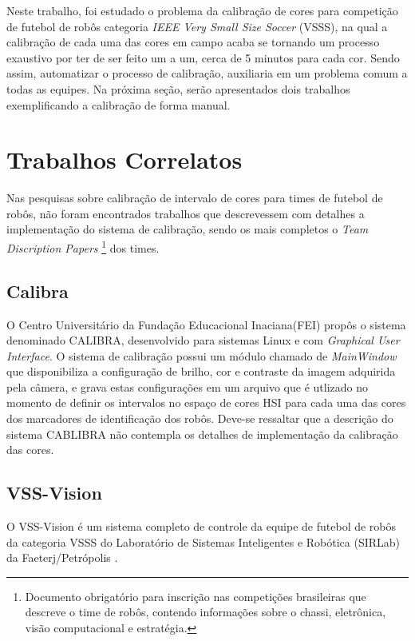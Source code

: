 Neste trabalho, foi estudado o problema da calibração de cores para competição de futebol de robôs categoria {\it IEEE Very Small Size Soccer} (VSSS), na qual a calibração de cada uma das cores em campo acaba se tornando um processo exaustivo por ter de ser feito um a um, cerca de 5 minutos para cada cor. Sendo assim, automatizar o processo de calibração, auxiliaria em um problema comum a todas as equipes. Na próxima seção, serão apresentados dois trabalhos exemplificando a calibração de forma manual.  

\section{Trabalhos Correlatos}
Nas pesquisas sobre calibração de intervalo de cores para times de futebol de robôs, não foram encontrados trabalhos que descrevessem com detalhes a implementação do sistema de calibração, sendo os mais completos o {\it Team Discription Papers}
\footnote{Documento obrigatório para inscrição nas competições brasileiras que descreve o time de robôs, contendo informações sobre o chassi, eletrônica, visão computacional e estratégia.} 
dos times.

\subsection{Calibra}
O Centro Universitário da Fundação Educacional Inaciana(FEI) propôs o sistema denominado CALIBRA, desenvolvido para sistemas Linux e com {\it Graphical User Interface}. O sistema de calibração possui um módulo chamado de {\it MainWindow} que disponibiliza a configuração de brilho, cor e contraste da imagem adquirida pela câmera, e grava estas configurações em um arquivo que é utlizado no momento de definir os intervalos no espaço de cores HSI para cada uma das cores dos marcadores de identificação dos robôs\cite{Penharbel:2004,PenharbelTime}. Deve-se ressaltar que a descrição do sistema CABLIBRA não contempla os detalhes de implementação da calibração das cores.

\subsection{VSS-Vision}

O VSS-Vision é um sistema completo de controle da equipe de futebol de robôs da categoria VSSS do Laboratório de Sistemas Inteligentes e Robótica (SIRLab) da Faeterj/Petrópolis  \cite{Rosa:2015}. %

